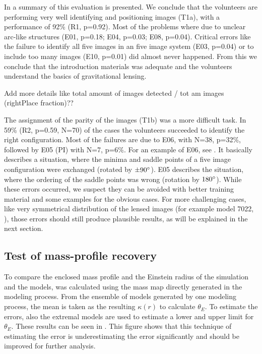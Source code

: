 In  a summary of this evaluation is presented.
We conclude that the volunteers are performing very well identifying and positioning images (T1a), with a performance of 92\% (R1, p=0.92).
Most of the problems where due to unclear arc-like structures (E01, p=0.18; E04, p=0.03; E08, p=0.04).
Critical errors like the failure to identify all five images in an five image system (E03, p=0.04) or to include too many images (E10, p=0.01) did almost never happened.
From this we conclude that the introduction materials was adequate and the volunteers understand the basics of gravitational lensing.

 Add more details like total amount of images detected / tot am images (rightPlace fraction)??

The assignment of the parity of the images (T1b) was a more difficult task.
In 59\% (R2, p=0.59, N=70) of the cases the volunteers succeeded to identify the right configuration.
Most of the failures are due to E06, with N=38, p=32\%, followed by E05 (PI) with N=7, p=6\%.
For an example of E06, see .
It basically describes a situation, where the minima and saddle points of a five image configuration were exchanged (rotated by $\pm90^{\circ}$).
E05 describes the situation, where the ordering of the saddle points was wrong (rotation by $180^{\circ}$).
While these errors occurred, we suspect they can be avoided with better training material and some examples for the obvious cases.
For more challenging cases, like very symmetrical distribution of the lensed images (for example model 7022, ), those errors should still produce plausible results, as will be explained in the next section.



\subsection{Test of mass-profile recovery} \label{sec:tests.t2}

To compare the enclosed mass profile and the Einstein radius of the simulation and the models, \kenc was calculated using the mass map \kap[x,y] directly generated in the modeling process.
From the ensemble of models generated by one modeling process, the mean is taken as the resulting $\kappa(r)$ to calculate $\theta_E$.
To estimate the errors, also the extremal models are used to estimate a lower and upper limit for $\theta_E$.
These results can be seen in .
This figure shows that this technique of estimating the error is underestimating the error significantly and should be improved for further analysis.


